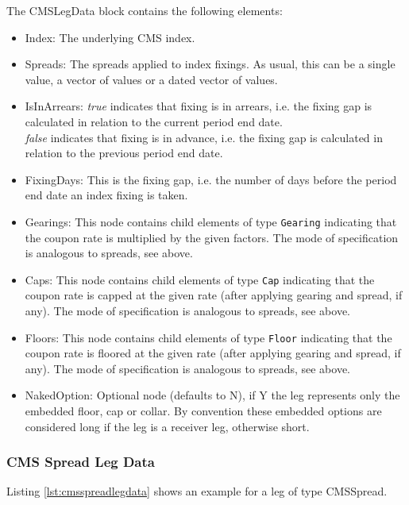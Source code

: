 The CMSLegData block contains the following elements:

\begin{itemize}
\item Index: The underlying CMS index.
\item Spreads: The spreads applied to index fixings. As usual, this can be a single value, a vector of values or a dated vector of
  values.
\item IsInArrears:  \emph{true} indicates that  fixing is in arrears,
  i.e. the fixing gap is calculated in relation to the current period
  end date.\\ \emph{false} indicates that  fixing is in advance,
  i.e. the fixing gap is calculated in relation to the previous period
  end date.  
\item FixingDays: This is the fixing gap, i.e. the number of days
  before the period end date an index fixing is taken.   
\item Gearings: This node contains child elements of type \lstinline!Gearing! indicating that the coupon rate is
  multiplied by the given factors. The mode of specification is analogous to spreads, see above.
\item Caps: This node contains child elements of type \lstinline!Cap! indicating that the coupon rate is capped at the
  given rate (after applying gearing and spread, if any). The mode of specification is analogous to spreads, see above.
\item Floors: This node contains child elements of type \lstinline!Floor! indicating that the coupon rate is floored at
  the given rate (after applying gearing and spread, if any). The mode of specification is analogous to spreads, see
  above.
\item NakedOption: Optional node (defaults to N), if Y the leg represents only the embedded floor, cap or collar. 
By convention these embedded options are considered long if the leg is a receiver leg, otherwise short. 
\end{itemize}

\subsubsection{CMS Spread Leg Data}
\label{ss:cmsspreadlegdata}

Listing \ref{lst:cmsspreadlegdata} shows an example for a leg of type CMSSpread.

